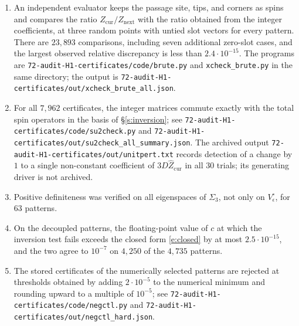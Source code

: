 \begin{enumerate}
\item An independent evaluator keeps the passage site, tips, and corners as spins and compares the ratio $Z_{\mathrm{cur}}/Z_{\mathrm{next}}$ with the ratio obtained from the integer coefficients, at three random points with untied slot vectors for every pattern. There are $23{,}893$ comparisons, including seven additional zero-slot cases, and the largest observed relative discrepancy is less than $2.4\cdot10^{-15}$. The programs are \texttt{72-\allowbreak audit-\allowbreak H1-\allowbreak certificates/\allowbreak code/\allowbreak brute.py} and \texttt{xcheck\_\allowbreak brute.py} in the same directory; the output is \texttt{72-\allowbreak audit-\allowbreak H1-\allowbreak certificates/\allowbreak out/\allowbreak xcheck\_\allowbreak brute\_\allowbreak all.json}.
\item For all $7{,}962$ certificates, the integer matrices commute exactly with the total spin operators in the basis of \S\ref{s:inversion}; see \texttt{72-\allowbreak audit-\allowbreak H1-\allowbreak certificates/\allowbreak code/\allowbreak su2check.py} and \texttt{72-\allowbreak audit-\allowbreak H1-\allowbreak certificates/\allowbreak out/\allowbreak su2check\_\allowbreak all\_\allowbreak summary.json}. The archived output \texttt{72-\allowbreak audit-\allowbreak H1-\allowbreak certificates/\allowbreak out/\allowbreak unitpert.txt} records detection of a change by $1$ to a single non-constant coefficient of $3D\hat Z_{\mathrm{cur}}$ in all $30$ trials; its generating driver is not archived.
\item Positive definiteness was verified on all eigenspaces of $\Sigma_3$, not only on $V_\epsilon^{\circ}$, for $63$ patterns.
\item On the decoupled patterns, the floating-point value of $c$ at which the inversion test fails exceeds the closed form \eqref{e:closed} by at most $2.5 \cdot 10^{-15}$, and the two agree to $10^{-7}$ on $4{,}250$ of the $4{,}735$ patterns.
\item The stored certificates of the numerically selected patterns are rejected at thresholds obtained by adding $2\cdot10^{-5}$ to the numerical minimum and rounding upward to a multiple of $10^{-5}$; see \texttt{72-\allowbreak audit-\allowbreak H1-\allowbreak certificates/\allowbreak code/\linebreak[1]negctl.py} and \texttt{72-\allowbreak audit-\allowbreak H1-\allowbreak certificates/\allowbreak out/\allowbreak negctl\_\allowbreak hard.json}.
\end{enumerate}
